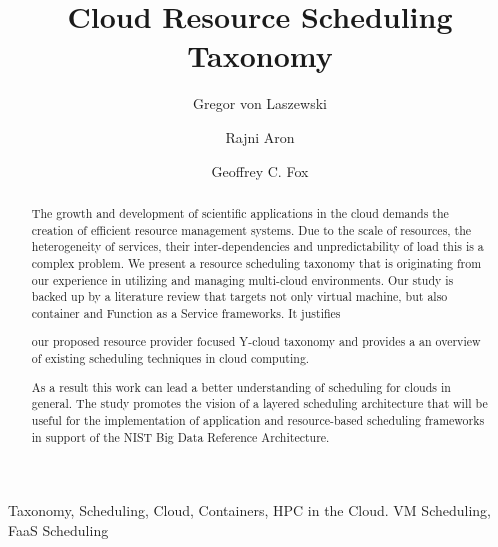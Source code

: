 \documentclass[final,5p,times,twocolumn]{elsarticle}
\author[label1]{Gregor von Laszewski\corref{cor1}\fnref{label3}}
\author[label2]{Rajni Aron}
\author[label1]{Geoffrey C. Fox}
\newcommand{\TITLE}{Cloud Resource Scheduling Taxonomy}
\begin{document}
\onecolumn







\begin{frontmatter}
\title{\TITLE}

\maketitle



\begin{keyword}
Taxonomy, Scheduling, Cloud, Containers, HPC in the Cloud. VM Scheduling, FaaS Scheduling
\end{keyword}

\begin{abstract}

The growth and development of scientific applications in the cloud
demands the creation of efficient resource management systems. Due to
the scale of resources, the heterogeneity of services, their
inter-dependencies and unpredictability of load this is a complex
problem. We present a resource scheduling taxonomy that is originating
from our experience in utilizing and managing multi-cloud environments. 
Our study is backed up by a literature review that
targets not only virtual machine, but also container and Function as a
Service frameworks. It justifies

\color{red}

our proposed resource provider focused Y-cloud taxonomy and provides a an overview
of existing scheduling techniques in cloud computing.

\color{black}

As a result this
work can lead a better understanding of scheduling for clouds
in general. The study promotes the vision of a layered scheduling
architecture that will be useful for the implementation of application
and resource-based scheduling frameworks in support of the NIST Big
Data Reference Architecture.

\end{abstract}

\end{frontmatter}

\color{black}
\end{document}
